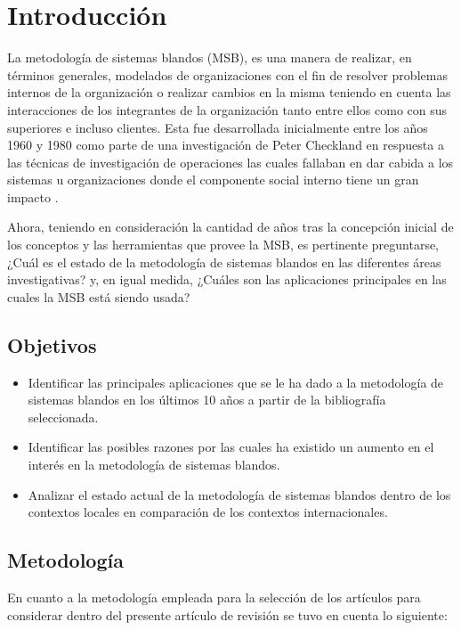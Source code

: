 \documentclass[10pt,letterpaper,twoside,twocolumn]{article}   %
\begin{document}
\section{Introducción}
La metodología de sistemas blandos (MSB), es una manera de realizar, en términos generales, modelados de organizaciones con el fin de resolver problemas internos de la organización o realizar cambios en la misma teniendo en cuenta las interacciones de los integrantes de la organización tanto entre ellos como con sus superiores e incluso clientes. Esta fue desarrollada inicialmente entre los años 1960 y 1980 como parte de una investigación de Peter Checkland en respuesta a las técnicas de investigación de operaciones las cuales fallaban en dar cabida a los sistemas u organizaciones donde el componente social interno tiene un gran impacto \cite{Checkland[1]}. 

Ahora, teniendo en consideración la cantidad de años tras la concepción inicial de los conceptos y las herramientas que provee la MSB, es pertinente preguntarse, ¿Cuál es el estado de la metodología de sistemas blandos en las diferentes áreas investigativas? y, en igual medida, ¿Cuáles son las aplicaciones principales en las cuales la MSB está siendo usada? 

\subsection{Objetivos}

\begin{itemize}
  \item Identificar las principales aplicaciones que se le ha dado a la metodología de sistemas blandos en los últimos 10 años a partir de la bibliografía seleccionada.
  \item Identificar las posibles razones por las cuales ha existido un aumento en el interés en la metodología de sistemas blandos.
  \item Analizar el estado actual de la metodología de sistemas blandos dentro de los contextos locales en comparación de los contextos internacionales. 
\end{itemize}

\subsection{Metodología}

En cuanto a la metodología empleada para la selección de los artículos para considerar dentro del presente artículo de revisión se tuvo en cuenta lo siguiente:
\end{document}
